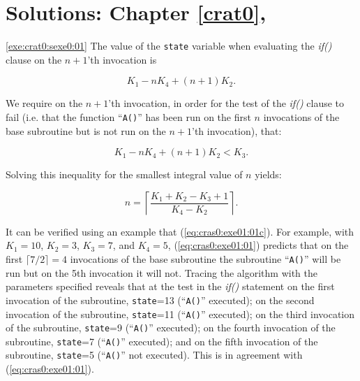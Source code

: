 
\chapter[Solutions: \cratzeroxrefcomma{}Chapter \ref{crat0}]
        {Solutions: \cratzeroxrefcomma{}Chapter \ref{crat0}, \cratzerolongtitle{}}

\label{cras0}

\vworkexercisechapterheader{}
\begin{vworkexercisesolution}{\ref{exe:crat0:sexe0:01}}
The value of the \texttt{state} variable when 
evaluating the \emph{if()} clause on the
$n+1$'th invocation is

\begin{equation}
\label{eq:cras0:exe01:01}
K_1 - nK_4 + (n+1) K_2 .
\end{equation}

We require on the $n+1$'th invocation, in order for the 
test of the \emph{if()} clause to fail (i.e. that the function
``\texttt{A()}'' has been run on the first $n$ invocations of
the base subroutine but is not run on the $n+1$'th invocation), 
that:

\begin{equation}
\label{eq:cras0:exe01:01b}
K_1 - nK_4 + (n+1) K_2 < K_3.
\end{equation}

Solving this inequality for the smallest integral
value of $n$ yields:

\begin{equation}
\label{eq:cras0:exe01:01c}
n = \left\lceil
\frac{K_1 + K_2 - K_3 + 1}{K_4 - K_2}
\right\rceil .
\end{equation}

It can be verified using an example that 
(\ref{eq:cras0:exe01:01c}).  For example, with
$K_1 = 10$, $K_2 = 3$, $K_3 = 7$, and $K_4 = 5$, 
(\ref{eq:cras0:exe01:01}) predicts that on the first
$\lceil 7/2 \rceil = 4$ invocations of the base subroutine
the subroutine ``\texttt{A()}'' will be run but on the 5th
invocation it will not.  Tracing the algorithm with the
parameters specified reveals that at the
test in the \emph{if()} statement 
on the first invocation of the
subroutine, \texttt{state}=13 (``\texttt{A()}'' executed);
on the second invocation of the
subroutine, \texttt{state}=11 (``\texttt{A()}'' executed);
on the third invocation of the
subroutine, \texttt{state}=9 (``\texttt{A()}'' executed);
on the fourth invocation of the
subroutine, \texttt{state}=7 (``\texttt{A()}'' executed);
and on the fifth invocation of the
subroutine, \texttt{state}=5 (``\texttt{A()}'' not executed).
This is in agreement with
(\ref{eq:cras0:exe01:01}). 
\end{vworkexercisesolution}
\vworkexercisechapterfooter

